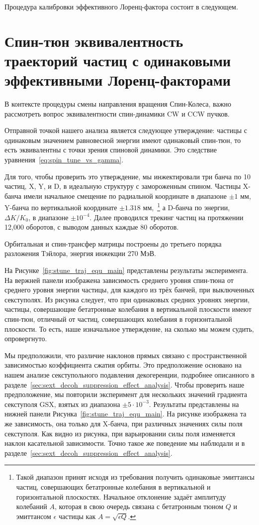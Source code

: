 Процедура калибровки эффективного Лоренц-фактора состоит в следующем.



\section{Спин-тюн эквивалентность траекторий частиц с одинаковыми эффективными Лоренц-факторами}\label{sec:spin_tune_traj_equivalence}
В контексте процедуры смены направления вращения Спин-Колеса, важно рассмотреть вопрос эквивалентности спин-динамики CW и CCW пучков. 

Отправной точкой нашего анализа является следующее утверждение: частицы с одинаковым значением равновесной энергии имеют одинаковый спин-тюн, то есть эквивалентны с точки зрения спиновой динамики. Это следствие уравнения~\eqref{eq:spin_tune_vs_gamma}. 

Для того, чтобы проверить это утверждение, мы инжектировали три банча по 10 частиц, X, Y, и D, в идеальную структуру с замороженным спином. Частицы X-банча имели начальное смещение по радиальной координате в диапазоне $\pm 1$ мм, Y-банча по вертикальной координате $\pm 1.318$ мм,~\footnote{Такой диапазон принят исходя из требования получить одинаковые эмиттансы частиц, совершающих бетатронные колебания в вертикальной и горизонтальной плоскостях. Начальное отклонение задаёт амплитуду колебаний $A$, которая в свою очередь связана с бетатронным тюном $Q$ и эмиттансом $\epsilon$ частицы как $A = \sqrt{\epsilon Q}$. } а D-банча по энергии,  $\Delta K/K_0$, в диапазоне $\pm 10^{-4}$. Далее проводился трекинг частиц на протяжении 12,000 оборотов, с выводом данных каждые 80 оборотов.

Орбитальная и спин-трансфер матрицы построены до третьего порядка разложения Тэйлора, энергия инжекции 270 МэВ.

На Рисунке~\ref{fig:stune_traj_equ_main} представлены результаты эксперимента. На вержней панели изображена зависимость среднего уровня спин-тюна от среднего уровня энергии частицы, для каждого из трёх банчей, при выключенных секступолях. Из рисунка следует, что при одинаковых средних уровнях энергии, частицы, совершающие бетатронные колебания в вертикальной плоскости имеют спин-тюн, отличный от частиц, совершающих колебания в горизонтальной плоскости. То есть, наше изначальное утверждение, на сколько мы можем судить, опровергнуто.

Мы предположили, что различие наклонов прямых связано с пространственной зависимостью коэффициента сжатия орбиты. Это предположение основано на нашем анализе секступольного подавления декогеренции, подробнее описанного в разделе~\ref{sec:sext_decoh_suppression_effect_analysis}. Чтобы проверить наше предположение, мы повторили эксперимент для нескольких значений градиента секступоля GSX, взятых из диапазона $\pm 5\cdot 10^{-3}$.  Результаты представлены на  нижней панели Рисунка~\ref{fig:stune_traj_equ_main}. На рисунке изображена та же зависимость, она только для X-банча, при различных значениях силы поля секступоля. Как видно из рисунка, при варьировании силы поля изменяется наклон касательной зависимости. Точно такое же поведение мы наблюдали и в разделе~\ref{sec:sext_decoh_suppression_effect_analysis}.

